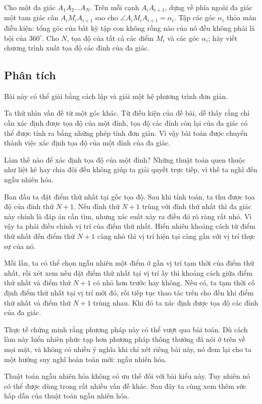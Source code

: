 \documentclass[11pt]{article}
\begin{document}
Cho một đa giác $A_1A_2\ldots A_N$. Trên mỗi cạnh $A_iA_{i+1}$, dựng về phía
ngoài đa giác một tam giác cân $A_iM_iA_{i+1}$ sao cho
$\angle A_iM_iA_{i+1}=\alpha_i$. Tập các góc $\alpha_i$ thỏa mãn điều kiện:
tổng góc của bất kỳ tập con không rỗng nào của nó đều không phải là bội của
$360^\circ$. Cho $N$, tọa độ của tất cả các điểm $M_i$ và các góc
$\alpha_i$; hãy viết chương trình xuất tọa độ các đỉnh của đa giác.

\subsection*{Phân tích}

Bài này có thể giải bằng cách lập và giải một hệ phương trình đơn giản.

Ta thử nhìn vấn đề từ một góc khác. Từ điều kiện của đề bài, dễ thấy rằng chỉ
cần xác định được tọa độ của một đỉnh, tọa độ các đỉnh còn lại của đa giác có
thể được tính ra bằng những phép tính đơn giản. Vì vậy bài toán được chuyển
thành việc xác định tọa độ của một đỉnh của đa giác.

Làm thế nào để xác định tọa độ của một đỉnh? Những thuật toán quen thuộc như
liệt kê hay chia đôi đều không giúp ta giải quyết trực tiếp, vì thế ta nghĩ
đến ngẫu nhiên hóa.

Ban đầu ta đặt điểm thứ nhất tại gốc tọa độ. Sau khi tính toán, ta thu được
tọa độ của đỉnh thứ $N+1$. Nếu đỉnh thứ $N+1$ trùng với đỉnh thứ nhất thì đa
giác này chính là đáp án cần tìm, nhưng xác suất xảy ra điều đó rõ ràng rất
nhỏ. Vì vậy ta phải điều chỉnh vị trí của điểm thứ nhất. Hiển nhiên khoảng
cách từ điểm thứ nhất đến điểm thứ $N+1$ càng nhỏ thì vị trí hiện tại càng
gần với vị trí thực sự của nó.

Mỗi lần, ta có thể chọn ngẫu nhiên một điểm ở gần vị trí tạm thời của điểm
thứ nhất, rồi xét xem nếu đặt điểm thứ nhất tại vị trí ấy thì khoảng cách
giữa điểm thứ nhất và điểm thứ $N+1$ có nhỏ hơn trước hay không. Nếu có, ta
tạm thời cố định điểm thứ nhất tại vị trí mới đó, rồi tiếp tục thao tác trên
cho đến khi điểm thứ nhất và điểm thứ $N+1$ trùng nhau. Khi đó ta xác định
được tọa độ các đỉnh của đa giác.

Thực tế chứng minh rằng phương pháp này có thể vượt qua bài toán. Dù cách
làm này hiển nhiên phức tạp hơn phương pháp thông thường đã nói ở trên về
mọi mặt, và không có nhiều ý nghĩa khi chỉ xét riêng bài này, nó đem lại cho
ta một hướng suy nghĩ hoàn toàn mới: ngẫu nhiên hóa.

Thuật toán ngẫu nhiên hóa không có ưu thế đối với bài kiểu này. Tuy nhiên nó
có thể được dùng trong rất nhiều vấn đề khác. Sau đây ta cùng xem thêm sức
hấp dẫn của thuật toán ngẫu nhiên hóa.
\end{document}
